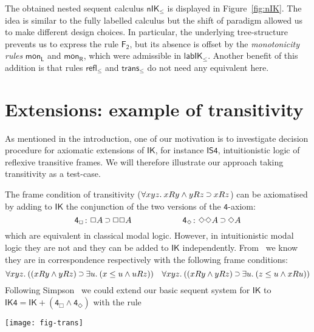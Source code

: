 \documentclass[twoside]{aiml20}
\newcommand*{\ax}[1]{\mathsf{#1}}
\newcommand*{\AND}{\mathbin{\wedge}}
\newcommand*{\IMP}{\mathbin{\scalebox{.9}{\raise.2ex\hbox{$\supset$}}}}
\newcommand*{\BOX}{\mathord{\Box}}
\newcommand*{\DIA}{\mathord{\Diamond}}
\newcommand*{\IK}{\mathsf{IK}}
\newcommand*{\lab}{\mathsf{lab}}
\newcommand*{\n}{\mathsf{n}}
\newcommand*{\labIKp}{\lab\IK_{\le}}
\newcommand*{\nIKp}{\n\IK_{\le}}
\newcommand*{\rn}[1]  {\ensuremath{\mathsf{#1}}}
\newcommand*{\rrn}[2][]  {\rn{#2}_\rn{R#1}}
\newcommand*{\lrn}[2][]  {\rn{#2}_\rn{L#1}}
\newcommand*{\lb}[1]{#1}%
\newcommand*{\fm}[1]{#1}%
\newcommand*{\accs}[2]{\lb{#1}R\lb{#2}}
\newcommand*{\futs}[2]{\lb{#1}\le{\lb{#2}}}
\begin{document}
The obtained nested sequent calculus $\nIKp$ is displayed in Figure~\ref{fig:nIK}.
%
The idea is similar to the fully labelled calculus but the shift of paradigm allowed us to make different design choices.
%
In particular, the underlying tree-structure prevents us to express the rule $\rn{F_2}$, but its absence is offset by the \emph{monotonicity rules} $\lrn{mon}$ and $\rrn{mon}$, which were admissible in $\labIKp$.
%
Another benefit of this addition is that rules $\rn{refl_\le}$ and $\rn{trans_\le}$ do not need any equivalent here.


\section{Extensions: example of transitivity}\label{sec:extensions}

As mentioned in the introduction, one of our motivation is to investigate decision procedure for axiomatic extensions of $\IK$, for instance $\mathsf{IS4}$, intuitionistic logic of reflexive transitive frames.
%
We will therefore illustrate our approach taking transitivity as a test-case.

The frame condition of transitivity ($\forall \lb {xyz}.\:\accs xy\AND \accs yz\IMP\accs xz$) can be axiomatised by adding to $\IK$ the conjunction of the two versions of the $\ax 4$-axiom:%
$$
\ax{4_{\BOX}}\colon\fm{\BOX A\IMP \BOX\BOX A}
\qquad\qquad\qquad
\ax{4_{\DIA}}\colon\fm{\DIA\DIA A\IMP\DIA A}
$$
%
which are equivalent in classical modal logic. 
%
However, in intuitionistic modal logic they are not and they can be added to $\IK$ independently.
%
From~\cite{plotkin1986} we know they are in correspondence respectively with the following frame conditions:%
%
{\small
\begin{equation}
\label{eq:4frame}
\forall\lb{xyz}.\:((\accs xy\AND \accs yz)\IMP\exists\lb{u}.\:(\futs x{u}\AND\accs {u}z))
\quad
\forall\lb{xyz}.\:((\accs xy\AND \accs yz)\IMP\exists\lb{u}.\:(\futs z{u}\AND\accs {x}{u}))
\end{equation}}
%
Following Simpson~\cite{simpson1994} we could extend our basic sequent system for $\IK$ to $\mathsf{IK4} = \IK+(\ax{4_{\BOX}}\AND\ax{4_{\DIA}})$ with the rule%
%
\begin{center}
\texttt{[image: fig-trans]}
\end{center}
\end{document}
